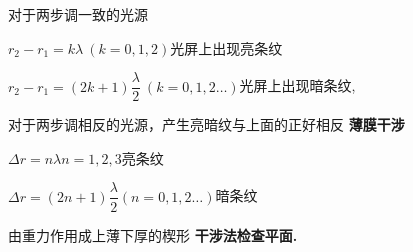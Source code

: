 
对于两步调一致的光源 %

$r_2-r_1=k\lambda\ (k=0,1,2)$\quad 光屏上出现亮条纹 %

$r_2-r_1=(2k+1)\dfrac{\lambda}{2}\ (k=0,1,2\ldots)$\quad 光屏上出现暗条纹,

对于两步调相反的光源，产生亮暗纹与上面的正好相反
\textbf{薄膜干涉}


$\Delta r=n\lambda$\quad $n=1,2,3$\quad 亮条纹

$\Delta r=(2n+1)\dfrac{\lambda}{2}$\quad $(n=0,1,2\ldots)$\quad 暗条纹

由重力作用成上薄下厚的楔形
\textbf{干涉法检查平面.}


